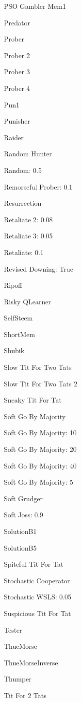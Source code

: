 \item PSO Gambler Mem1
\item Predator
\item Prober
\item Prober 2
\item Prober 3
\item Prober 4
\item Pun1
\item Punisher
\item Raider
\item Random Hunter
\item Random: 0.5
\item Remorseful Prober: 0.1
\item Resurrection
\item Retaliate 2: 0.08
\item Retaliate 3: 0.05
\item Retaliate: 0.1
\item Revised Downing: True
\item Ripoff
\item Risky QLearner
\item SelfSteem
\item ShortMem
\item Shubik
\item Slow Tit For Two Tats
\item Slow Tit For Two Tats 2
\item Sneaky Tit For Tat
\item Soft Go By Majority
\item Soft Go By Majority: 10
\item Soft Go By Majority: 20
\item Soft Go By Majority: 40
\item Soft Go By Majority: 5
\item Soft Grudger
\item Soft Joss: 0.9
\item SolutionB1
\item SolutionB5
\item Spiteful Tit For Tat
\item Stochastic Cooperator
\item Stochastic WSLS: 0.05
\item Suspicious Tit For Tat
\item Tester
\item ThueMorse
\item ThueMorseInverse
\item Thumper
\item Tit For 2 Tats
